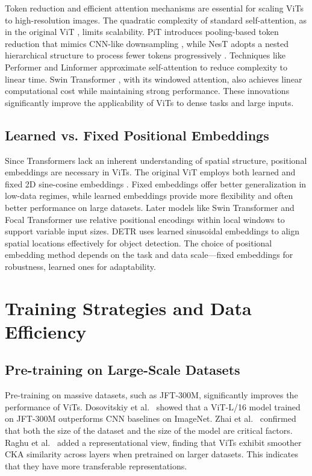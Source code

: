 \documentclass[conference]{IEEEtran}
\begin{document}
Token reduction and efficient attention mechanisms are essential for scaling ViTs to high-resolution images. The quadratic complexity of standard self-attention, as in the original ViT \cite{dosovitskiy2021an}, limits scalability. PiT introduces pooling-based token reduction that mimics CNN-like downsampling \cite{heo2021rethinking}, while NesT adopts a nested hierarchical structure to process fewer tokens progressively \cite{zhang2021aggregating}. Techniques like Performer \cite{choromanski2021rethinking} and Linformer \cite{wang2020linformer} approximate self-attention to reduce complexity to linear time. Swin Transformer \cite{liu2021swin}, with its windowed attention, also achieves linear computational cost while maintaining strong performance. These innovations significantly improve the applicability of ViTs to dense tasks and large inputs.

\subsection{Learned vs. Fixed Positional Embeddings}

Since Transformers lack an inherent understanding of spatial structure, positional embeddings are necessary in ViTs. The original ViT employs both learned and fixed 2D sine-cosine embeddings \cite{dosovitskiy2021an}. Fixed embeddings offer better generalization in low-data regimes, while learned embeddings provide more flexibility and often better performance on large datasets. Later models like Swin Transformer \cite{liu2021swin} and Focal Transformer \cite{yang2021focal} use relative positional encodings within local windows to support variable input sizes. DETR \cite{Carion2020endtoend} uses learned sinusoidal embeddings to align spatial locations effectively for object detection. The choice of positional embedding method depends on the task and data scale—fixed embeddings for robustness, learned ones for adaptability.


\section{Training Strategies and Data Efficiency}


\subsection{Pre-training on Large-Scale Datasets}

Pre-training on massive datasets, such as JFT-300M, significantly improves the performance of ViTs. Dosovitskiy et al.~\cite{dosovitskiy2021an} showed that a ViT-L/16 model trained on JFT-300M outperforms CNN baselines on ImageNet. Zhai et al.~\cite{zhai2022scaling} confirmed that both the size of the dataset and the size of the model are critical factors. Raghu et al.~\cite{raghu2021vision} added a representational view, finding that ViTs exhibit smoother CKA similarity across layers when pretrained on larger datasets. This indicates that they have more transferable representations.
\end{document}
